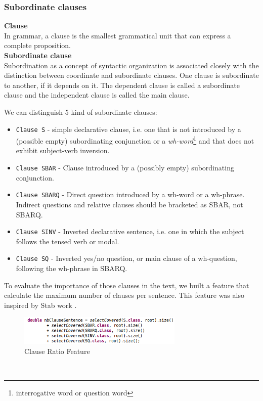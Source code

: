 \subsubsection{Subordinate clauses}
\textbf{Clause}
\\
In grammar, a clause is the smallest grammatical unit that can express a complete proposition. 
\\
\textbf{Subordinate clause}
\\
Subordination as a concept of syntactic organization is associated closely with the distinction between coordinate and subordinate clauses. One clause is subordinate to another, if it depends on it. The dependent clause is called a subordinate clause and the independent clause is called the main clause.

We can distinguish 5 kind of subordinate clauses:
\begin{itemize}
  \item \texttt{Clause S} - simple declarative clause, i.e. one that is not introduced by a (possible empty) subordinating conjunction or a \emph{wh-word}\footnote{interrogative word or question word} and that does not exhibit subject-verb inversion.
  \item \texttt{Clause SBAR} - Clause introduced by a (possibly empty) subordinating conjunction.
  \item \texttt{Clause SBARQ} - Direct question introduced by a wh-word or a wh-phrase. Indirect questions and relative clauses should be bracketed as SBAR, not SBARQ.
  \item \texttt{Clause SINV} - Inverted declarative sentence, i.e. one in which the subject follows the tensed verb or modal. 
  \item \texttt{Clause SQ} - Inverted yes/no question, or main clause of a wh-question, following the wh-phrase in SBARQ.
\end{itemize} 
To evaluate the importance of those clauses in the text, we built a feature that calculate the maximum number of clauses per sentence. This feature was also inspired by Stab work \cite{TUD-CS-2014-0882}.
\
\begin{figure}[H]
    \centering
    \includegraphics[width=0.7\textwidth]{fig/subclause.png}
    \caption[Short caption]{Clause Ratio Feature}
    \label{fig:subclause}
\end{figure}
\

